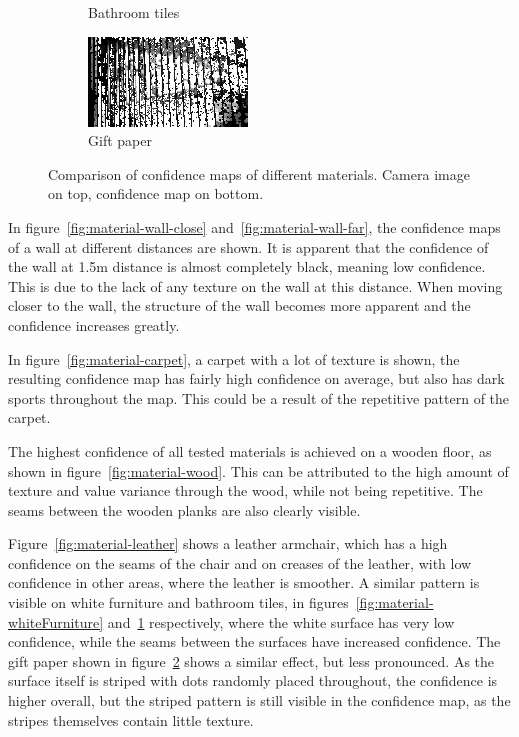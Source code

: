 \begin{figure}[h!t]
\begin{subfigure}[b]{0.25\textwidth}
        \caption{Bathroom tiles}
        \label{fig:material-tiles}
    \end{subfigure}%
    \begin{subfigure}[b]{0.25\textwidth}
        \centering
        \includegraphics[width=0.9\linewidth]{images/materials/giftpaper-conf}
        \caption{Gift paper}
        \label{fig:material-giftpaper}
    \end{subfigure}%

    \caption{Comparison of confidence maps of different materials. Camera image on top, confidence map on bottom.}
    \label{fig:materials}
\end{figure}

In figure~\ref{fig:material-wall-close} and~\ref{fig:material-wall-far}, the confidence maps of a wall at different distances are shown.
It is apparent that the confidence of the wall at 1.5m distance is almost completely black, meaning low confidence.
This is due to the lack of any texture on the wall at this distance.
When moving closer to the wall, the structure of the wall becomes more apparent and the confidence increases greatly.

In figure~\ref{fig:material-carpet}, a carpet with a lot of texture is shown, the resulting confidence map has fairly high confidence on average,
but also has dark sports throughout the map.
This could be a result of the repetitive pattern of the carpet.

The highest confidence of all tested materials is achieved on a wooden floor, as shown in figure~\ref{fig:material-wood}.
This can be attributed to the high amount of texture and value variance through the wood, while not being repetitive.
The seams between the wooden planks are also clearly visible.

Figure~\ref{fig:material-leather} shows a leather armchair, which has a high confidence on the seams of the chair and
on creases of the leather, with low confidence in other areas, where the leather is smoother.
A similar pattern is visible on white furniture and bathroom tiles, in figures~\ref{fig:material-whiteFurniture} and~\ref{fig:material-tiles} respectively,
where the white surface has very low confidence, while the seams between the surfaces have increased confidence.
The gift paper shown in figure~\ref{fig:material-giftpaper} shows a similar effect, but less pronounced.
As the surface itself is striped with dots randomly placed throughout, the confidence is higher overall,
but the striped pattern is still visible in the confidence map, as the stripes themselves contain little texture.

